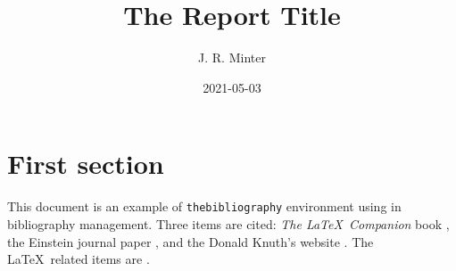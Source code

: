 \documentclass[12pt]{article}
\title{The Report Title}
\author{J. R. Minter}
\date{2021-05-03}
\begin{document}
\maketitle
\nocite{*}

\section{First section}



This document is an example of \texttt{thebibliography} environment using 
in bibliography management. Three items are cited: \textit{The \LaTeX\ Companion} 
book \cite{latexcompanion}, the Einstein journal paper \cite{einstein}, and the 
Donald Knuth's website \cite{knuthwebsite}. The \LaTeX\ related items are
\cite{latexcompanion,knuthwebsite}. 

\medskip

\raggedright

\end{document}
